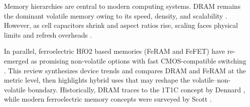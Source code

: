 Memory hierarchies are central to modern computing systems. DRAM remains the dominant volatile memory owing to its speed, density, and scalability \cite{choi2022,kim2021_dram}. However, as cell capacitors shrink and aspect ratios rise, scaling faces physical limits and refresh overheads \cite{kim2021_dram,iedm2023_dram}.

In parallel, ferroelectric HfO2 based memories (FeRAM and FeFET) have re-emerged as promising non-volatile options with fast CMOS-compatible switching \cite{boscke2011,mueller2012,noheda2023}. This review synthesizes device trends and compares DRAM and FeRAM at the metric level, then highlights hybrid uses that may reshape the volatile--non-volatile boundary. Historically, DRAM traces to the 1T1C concept by Dennard \cite{dennard1966}, while modern ferroelectric memory concepts were surveyed by Scott \cite{scott1998}.
